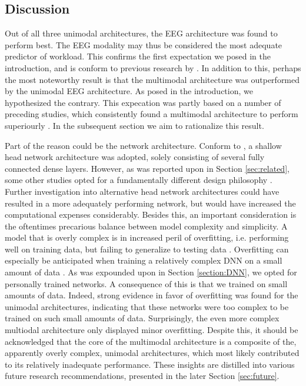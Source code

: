 \documentclass[fleqn,11pt]{paper}
\begin{document}
\subsection{Discussion}
Out of all three unimodal architectures, the EEG architecture was found to perform best. The EEG modality may thus be considered the most adequate predictor of workload. This confirms the first expectation we posed in the introduction, and is conform to previous research by \cite{hogervorst2014combining}. In addition to this, perhaps the most noteworthy result is that the multimodal architecture was outperformed by the unimodal EEG architecture. As posed in the introduction, we hypothesized the contrary. This expecation was partly based on a number of preceding studies, which consistently found a multimodal architecture to perform superiourly \cite{dolmans2020perceived, han2020classification, rastgoo2019automatic, yin2017recognition}. In the subsequent section we aim to rationalize this result. 

Part of the reason could be the network architecture. Conform to  , a shallow head network architecture was adopted, solely consisting of several fully connected dense layers. However, as was reported upon in Section \ref{sec:related}, some other studies opted for a fundamentally different design philosophy \cite{dolmans2020perceived, rastgoo2019automatic}. Further investigation into alternative head network architectures could have resulted in a more adequately performing network,  but would have increased the computational expenses considerably. Besides this, an important consideration is the oftentimes precarious balance between model complexity and simplicity. A model that is overly complex is in increased peril of overfitting, i.e. performing well on training data, but failing to generalize to testing data \cite{lever2016points}. Overfitting can especially be anticipated when training a relatively complex DNN on a small amount of data \cite{aggarwal2018neural, feng2019using}. As was expounded upon in Section \ref{section:DNN}, we opted for personally trained networks. A consequence of this is that we trained on small amounts of data. Indeed, strong evidence in favor of overfitting was found for the unimodal architectures, indicating that these networks were too complex to be trained on such small amounts of data. Surprisingly, the even more complex multiodal architecture only displayed minor overfitting. Despite this, it should be acknowledged that the core of the multimodal architecture is a composite of the, apparently overly complex, unimodal architectures, which most likely contributed to its relatively inadequate performance. These insights are distilled into various future research recommendations, presented in the later Section \ref{sec:future}.
\end{document}
